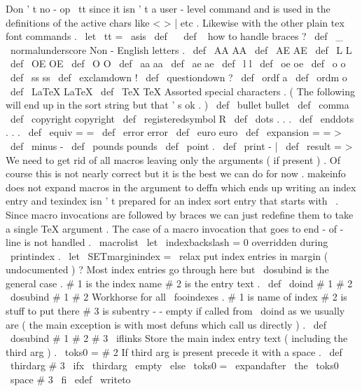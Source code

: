 {{%
%
Don
'
t
no
-
op
\
tt
since
it
isn
'
t
a
user
-
level
command
%
and
is
used
in
the
definitions
of
the
active
chars
like
<
>
|
etc
.
%
Likewise
with
the
other
plain
tex
font
commands
.
%
\
let
\
tt
=
\
asis
%
\
def
\
{
}
%
\
def
\
{
}
%
%
how
to
handle
braces
?
\
def
\
_
{
\
normalunderscore
}
%
%
%
Non
-
English
letters
.
\
def
\
AA
{
AA
}
%
\
def
\
AE
{
AE
}
%
\
def
\
L
{
L
}
%
\
def
\
OE
{
OE
}
%
\
def
\
O
{
O
}
%
\
def
\
aa
{
aa
}
%
\
def
\
ae
{
ae
}
%
\
def
\
l
{
l
}
%
\
def
\
oe
{
oe
}
%
\
def
\
o
{
o
}
%
\
def
\
ss
{
ss
}
%
\
def
\
exclamdown
{
!
}
%
\
def
\
questiondown
{
?
}
%
\
def
\
ordf
{
a
}
%
\
def
\
ordm
{
o
}
%
%
\
def
\
LaTeX
{
LaTeX
}
%
\
def
\
TeX
{
TeX
}
%
%
%
Assorted
special
characters
.
%
(
The
following
{
}
will
end
up
in
the
sort
string
but
that
'
s
ok
.
)
\
def
\
bullet
{
bullet
}
%
\
def
\
comma
{
}
%
\
def
\
copyright
{
copyright
}
%
\
def
\
registeredsymbol
{
R
}
%
\
def
\
dots
{
.
.
.
}
%
\
def
\
enddots
{
.
.
.
}
%
\
def
\
equiv
{
=
=
}
%
\
def
\
error
{
error
}
%
\
def
\
euro
{
euro
}
%
\
def
\
expansion
{
=
=
>
}
%
\
def
\
minus
{
-
}
%
\
def
\
pounds
{
pounds
}
%
\
def
\
point
{
.
}
%
\
def
\
print
{
-
|
}
%
\
def
\
result
{
=
>
}
%
%
%
We
need
to
get
rid
of
all
macros
leaving
only
the
arguments
(
if
present
)
.
%
Of
course
this
is
not
nearly
correct
but
it
is
the
best
we
can
do
for
now
.
%
makeinfo
does
not
expand
macros
in
the
argument
to
deffn
which
ends
up
%
writing
an
index
entry
and
texindex
isn
'
t
prepared
for
an
index
sort
entry
%
that
starts
with
\
.
%
%
Since
macro
invocations
are
followed
by
braces
we
can
just
redefine
them
%
to
take
a
single
TeX
argument
.
The
case
of
a
macro
invocation
that
%
goes
to
end
-
of
-
line
is
not
handled
.
%
\
macrolist
}
\
let
\
indexbackslash
=
0
%
overridden
during
\
printindex
.
\
let
\
SETmarginindex
=
\
relax
%
put
index
entries
in
margin
(
undocumented
)
?
%
Most
index
entries
go
through
here
but
\
dosubind
is
the
general
case
.
%
#
1
is
the
index
name
#
2
is
the
entry
text
.
\
def
\
doind
#
1
#
2
{
\
dosubind
{
#
1
}
{
#
2
}
{
}
}
%
Workhorse
for
all
\
fooindexes
.
%
#
1
is
name
of
index
#
2
is
stuff
to
put
there
#
3
is
subentry
-
-
%
empty
if
called
from
\
doind
as
we
usually
are
(
the
main
exception
%
is
with
most
defuns
which
call
us
directly
)
.
%
\
def
\
dosubind
#
1
#
2
#
3
{
%
\
iflinks
{
%
%
Store
the
main
index
entry
text
(
including
the
third
arg
)
.
\
toks0
=
{
#
2
}
%
%
If
third
arg
is
present
precede
it
with
a
space
.
\
def
\
thirdarg
{
#
3
}
%
\
ifx
\
thirdarg
\
empty
\
else
\
toks0
=
\
expandafter
{
\
the
\
toks0
\
space
#
3
}
%
\
fi
%
\
edef
\
writeto
{
\
}}}}

